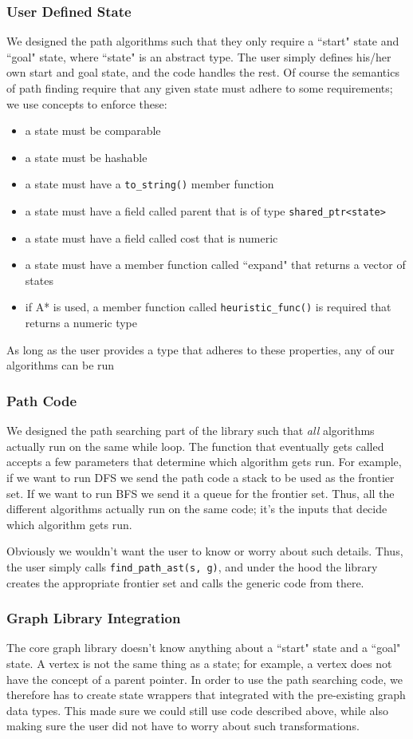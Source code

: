\documentclass{article}
\begin{document}
\subsubsection{User Defined State}
We designed the path algorithms such that they only require a ``start" state and ``goal" state, where ``state" is an abstract type. The user simply defines his/her own start and goal state, and the code handles the rest. Of course the semantics of path finding require that any given state must adhere to some requirements; we use concepts to enforce these:
\begin{itemize}
\item a state must be comparable
\item a state must be hashable
\item a state must have a \texttt{to\_string()} member function
\item a state must have a field called parent that is of type \texttt{shared\_ptr<state>}
\item a state must have a field called cost that is numeric
\item a state must have a member function called ``expand" that returns a vector of states
\item if A* is used, a member function called \texttt{heuristic\_func()} is required that returns a numeric type
\end{itemize}
As long as the user provides a type that adheres to these properties, any of our algorithms can be run

\subsubsection{Path Code}
We designed the path searching part of the library such that \emph{all} algorithms actually run on the same while loop. The function that eventually gets called accepts a few parameters that determine which algorithm gets run. For example, if we want to run DFS we send the path code a stack to be used as the frontier set. If we want to run BFS we send it a queue for the frontier set. Thus, all the different algorithms actually run on the same code; it's the inputs that decide which algorithm gets run. 
\par
Obviously we wouldn't want the user to know or worry about such details. Thus, the user simply calls \texttt{find\_path\_ast(s, g)}, and under the hood the library creates the appropriate frontier set and calls the generic code from there.

\subsubsection{Graph Library Integration}
The core graph library doesn't know anything about a ``start" state and a ``goal" state. A vertex is not the same thing as a state; for example, a vertex does not have the concept of a parent pointer. In order to use the path searching code, we therefore has to create state wrappers that integrated with the pre-existing graph data types. This made sure we could still use code described above, while also making sure the user did not have to worry about such transformations.
\end{document}
